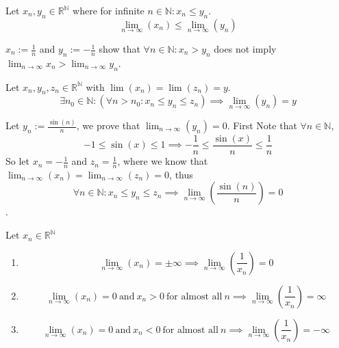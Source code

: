 \begin{proposition}\label{pro:limit_comp}
   Let \(x_n, y_n \in \mathbb{R}^\mathbb{N}\) where for infinite \(n \in \mathbb{N}: x_n \leq y_n\).
   \[\lim_{n \to \infty}(x_n) \leq \lim_{n \to \infty}(y_n)\]
\end{proposition}
\begin{remark}
   \(x_n := \frac{1}{n}\) and \(y_n := -\frac{1}{n}\) show that \(\forall n \in \mathbb{N}: x_n > y_n\) does not imply \(\lim_{n \to \infty} x_n > \lim_{n \to \infty} y_n\).
\end{remark}

\begin{proposition}\label{pro:sandwich_seq}
   Let \(x_n, y_n, z_n \in \mathbb{R}^\mathbb{N}\) with \(\lim(x_n) = \lim(z_n) = y\).
   \[\exists n_0 \in \mathbb{N}:(\forall n > n_0: x_n \leq y_n \leq z_n) \implies \lim_{n \to \infty}(y_n) = y\]
\end{proposition}
\begin{example}
   Let \(y_n := \frac{\sin(n)}{n}\), we prove that \(\lim_{n \to \infty}(y_n) = 0\).
   First Note that \(\forall n \in \mathbb{N}\),
   \[-1 \leq \sin(x) \leq 1 \implies -\frac{1}{n} \leq \frac{\sin(x)}{n} \leq \frac{1}{n}\]
   So let \(x_n = -\frac{1}{n}\) and \(z_n = \frac{1}{n}\), where we know that \(\lim_{n \to \infty}(x_n) = \lim_{n \to \infty}(z_n) = 0\), thus
   \[\forall n \in \mathbb{N}: x_n \leq y_n \leq z_n \implies \lim_{n \to \infty}\left(\frac{\sin(n)}{n}\right) = 0\].
\end{example}

\begin{theorem}
   Let \(x_n \in \mathbb{R}^\mathbb{N}\)
   \begin{enumerate}[label=\roman*, align=Center]
      \item \[\lim_{n \to \infty}(x_n) = \pm\infty \implies \lim_{n \to \infty}\left(\frac{1}{x_n}\right) = 0\]
      \item \[\lim_{n \to \infty}(x_n) = 0~\text{and}~x_n > 0~\text{for almost all}~n \implies \lim_{n \to \infty}\left(\frac{1}{x_n}\right) = \infty\]
      \item \[\lim_{n \to \infty}(x_n) = 0~\text{and}~x_n < 0~\text{for almost all}~n \implies \lim_{n \to \infty}\left(\frac{1}{x_n}\right) = -\infty\]
   \end{enumerate}
\end{theorem}

\newpage

